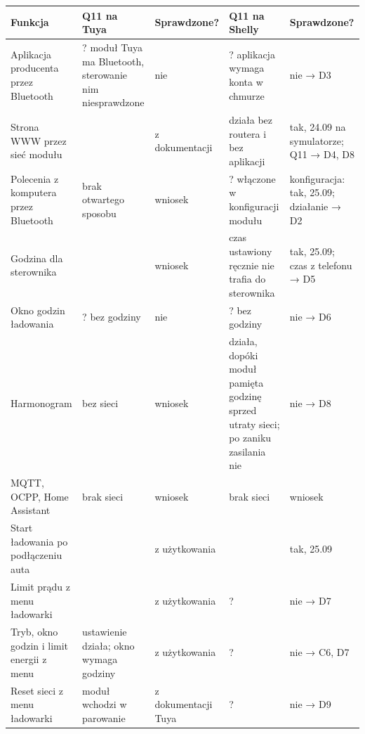 \documentclass[11pt,a4paper]{article}
\begin{document}
\begin{longtable}{>{\raggedright\arraybackslash}p{3.73cm}>{\raggedright\arraybackslash}p{2.57cm}>{\raggedright\arraybackslash}p{2.35cm}>{\raggedright\arraybackslash}p{3.23cm}>{\raggedright\arraybackslash}p{2.52cm}}
\toprule
\rowcolor{apteallight}\textbf{Funkcja} & \textbf{Q11 na Tuya} & \textbf{Sprawdzone?} & \textbf{Q11 na Shelly} & \textbf{Sprawdzone?} \\
\midrule\endhead
\bottomrule\endfoot
Aplikacja producenta przez Bluetooth & ? moduł Tuya ma Bluetooth, sterowanie nim niesprawdzone & nie & ? aplikacja wymaga konta w chmurze & nie {\symbolfont→} D3 \\
Strona WWW przez sieć modułu & \leavevmode{\symbolfont\color{apred}\textbf{✘}} & z dokumentacji & \leavevmode{\symbolfont\color{apamber}\textbf{◐}} działa bez routera i bez aplikacji & tak, 24.09 na symulatorze; Q11 {\symbolfont→} D4, D8 \\
Polecenia z komputera przez Bluetooth & \leavevmode{\symbolfont\color{apred}\textbf{✘}} brak otwartego sposobu & wniosek & ? włączone w konfiguracji modułu & konfiguracja: tak, 25.09; działanie {\symbolfont→} D2 \\
Godzina dla sterownika & \leavevmode{\symbolfont\color{apred}\textbf{✘}} & wniosek & \leavevmode{\symbolfont\color{apred}\textbf{✘}} czas ustawiony ręcznie nie trafia do sterownika & tak, 25.09; czas z telefonu {\symbolfont→} D5 \\
Okno godzin ładowania & ? bez godziny & nie & ? bez godziny & nie {\symbolfont→} D6 \\
Harmonogram & \leavevmode{\symbolfont\color{apred}\textbf{✘}} bez sieci & wniosek & \leavevmode{\symbolfont\color{apamber}\textbf{◐}} działa, dopóki moduł pamięta godzinę sprzed utraty sieci; po zaniku zasilania nie & nie {\symbolfont→} D8 \\
MQTT, OCPP, Home Assistant & \leavevmode{\symbolfont\color{apred}\textbf{✘}} brak sieci & wniosek & \leavevmode{\symbolfont\color{apred}\textbf{✘}} brak sieci & wniosek \\
Start ładowania po podłączeniu auta & \leavevmode{\symbolfont\color{apgreen}\textbf{✔}} & z użytkowania & \leavevmode{\symbolfont\color{apgreen}\textbf{✔}} & tak, 25.09 \\
Limit prądu z menu ładowarki & \leavevmode{\symbolfont\color{apgreen}\textbf{✔}} & z użytkowania & ? & nie {\symbolfont→} D7 \\
Tryb, okno godzin i limit energii z menu & \leavevmode{\symbolfont\color{apgreen}\textbf{✔}} ustawienie działa; okno wymaga godziny & z użytkowania & ? & nie {\symbolfont→} C6, D7 \\
Reset sieci z menu ładowarki & \leavevmode{\symbolfont\color{apgreen}\textbf{✔}} moduł wchodzi w parowanie & z dokumentacji Tuya & ? & nie {\symbolfont→} D9 \\
\end{longtable}
\end{document}
